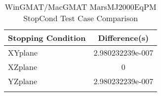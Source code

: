 \begin{table}[htbp!]
\centering
\caption{ WinGMAT/MacGMAT MarsMJ2000EqPM StopCond Test Case Comparison}
      \begin{tabular}{lc}
      \hline\hline
          Stopping Condition & Difference(s) \\
         \hline
         XYplane & 2.980232239e-007 \\
         XZplane & 0 \\
         YZplane & 2.980232239e-007 \\
      \hline\hline
      \label{Table: WinGMAT-MacGMAT MarsMJ2000EqPM StopCond Table} 
\end{tabular}
\end{table}
